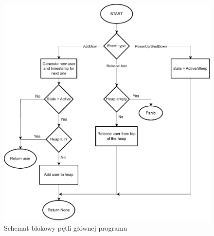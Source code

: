 \begin{figure}
\center
\includegraphics[scale=0.75]{img/station_event.pdf} 
\caption{Schemat blokowy pętli głównej programu}
\label{station_event}
\end{figure}


